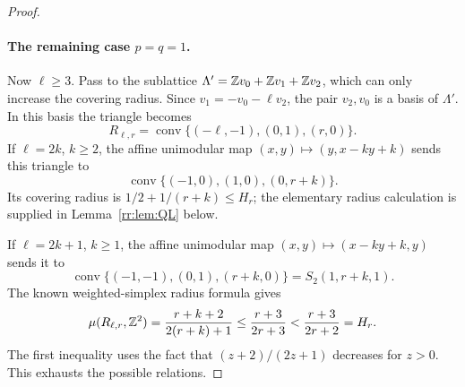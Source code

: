 \documentclass[11pt,a4paper]{article}
\theoremstyle{remark}\newtheorem{remark}[theorem]{Remark}
\DeclareMathOperator{\conv}{conv}
\begin{document}
\begin{proof}
\paragraph{The remaining case $p=q=1$.}
Now $\ell\ge3$.  Pass to the sublattice
$\Lambda'=\mathbb Z v_0+\mathbb Z v_1+\mathbb Z v_2$, which can only increase the
covering radius.  Since $v_1=-v_0-\ell v_2$, the pair $v_2,v_0$
is a basis of $\Lambda'$.  In this basis the triangle becomes
\[
 R_{\ell,r}=\conv\{(-\ell,-1),(0,1),(r,0)\}.
\]
If $\ell=2k$, $k\ge2$, the affine unimodular map
$(x,y)\mapsto(y,x-ky+k)$ sends this triangle to
\[
 \conv\{(-1,0),(1,0),(0,r+k)\}.
\]
Its covering radius is $1/2+1/(r+k)\le H_r$; the elementary
radius calculation is supplied in Lemma~\ref{rr:lem:QL} below.

If $\ell=2k+1$, $k\ge1$, the affine unimodular map
$(x,y)\mapsto(x-ky+k,y)$ sends it to
\[
 \conv\{(-1,-1),(0,1),(r+k,0)\}=S_2(1,r+k,1).
\]
The known weighted-simplex radius formula
\cite[Theorem 1.4]{CSS} gives
\[
 \mu(R_{\ell,r},\mathbb Z^2)
 =\frac{r+k+2}{2(r+k)+1}
 \le\frac{r+3}{2r+3}
 <\frac{r+3}{2r+2}=H_r.
\]
The first inequality uses the fact that $(z+2)/(2z+1)$ decreases
for $z>0$.  This exhausts the possible relations.
\end{proof}
\end{document}
